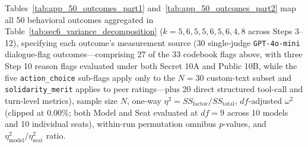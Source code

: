 Tables~\ref{tab:app_50_outcomes_part1} and~\ref{tab:app_50_outcomes_part2} map all 50 behavioral outcomes aggregated in Table~\ref{tab:sec6_variance_decomposition} ($k = 5, 6, 5, 5, 6, 5, 6, 4, 8$ across Steps 3--12), specifying each outcome's measurement source (30 single-judge \texttt{GPT-4o-mini} dialogue-flag outcomes---comprising 27 of the 33 codebook flags above, with three Step 10 reason flags evaluated under both Secret 10A and Public 10B, while the five \texttt{action\_choice} sub-flags apply only to the $N = 30$ custom-text subset and \texttt{solidarity\_merit} applies to peer ratings---plus 20 direct structured tool-call and turn-level metrics), sample size $N$, one-way $\eta^2 = SS_{\text{factor}} / SS_{\text{total}}$, $df$-adjusted $\omega^2$ (clipped at $0.00\%$; both Model and Seat evaluated at $df = 9$ across 10 models and 10 individual seats), within-run permutation omnibus $p$-values, and $\eta^2_{\text{model}} / \eta^2_{\text{seat}}$ ratio.

